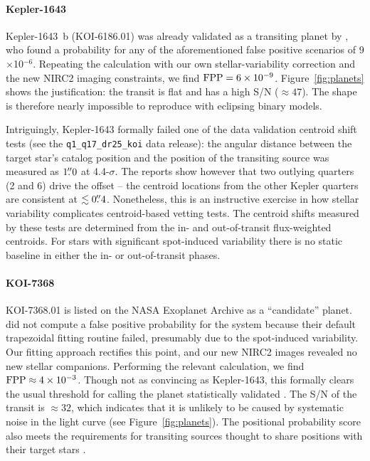\documentclass[12pt,twocolumn]{aastex63}
\begin{document}
\paragraph{Kepler-1643}
Kepler-1643~b (KOI-6186.01) was already validated as a transiting
planet by \citet{morton_false_2016}, who found a probability for any
of the aforementioned false positive scenarios of 9$\times$10$^{-6}$.
Repeating the calculation with our own stellar-variability correction
and the new NIRC2 imaging constraints, we find ${\rm FPP} =
6\times10^{-9}$.  Figure~\ref{fig:planets} shows the justification:
the transit is flat and has a high S/N ($\approx 47$).  The shape is
therefore nearly impossible to reproduce with eclipsing binary models.

Intriguingly, Kepler-1643 formally failed one of the data validation
centroid shift tests (see the \texttt{q1\_q17\_dr25\_koi} data
release): the angular distance between the target star's catalog
position and the position of the transiting source was measured as
$1\mbox{$.\!\!^{\prime\prime}$}0$ at 4.4-$\sigma$.  The reports show however that two
outlying quarters (2 and 6) drive the offset -- the centroid locations
from the other Kepler quarters are consistent at $\lesssim 0\mbox{$.\!\!^{\prime\prime}$}4$.
Nonetheless, this is an instructive exercise in how stellar
variability complicates centroid-based vetting tests.  The centroid
shifts measured by these tests are determined from the in- and
out-of-transit flux-weighted centroids.  For stars with significant
spot-induced variability there is no static baseline in either the in-
or out-of-transit phases.

\paragraph{KOI-7368}
KOI-7368.01 is listed on the NASA Exoplanet Archive as a ``candidate''
planet.  \citet{morton_false_2016} did not compute a false positive
probability for the system because their default trapezoidal fitting
routine failed, presumably due to the spot-induced variability.  Our
fitting approach rectifies this point, and our new NIRC2 images
revealed no new stellar companions.  Performing the relevant
calculation, we find ${\rm FPP} \approx 4\times10^{-3}$.  Though not
as convincing as Kepler-1643, this formally clears the usual threshold
for calling the planet statistically validated
\citep{morton_efficient_2012}.  The S/N of the transit is
$\approx$$32$, which indicates that it is unlikely to be caused by
systematic noise in the light curve (see Figure~\ref{fig:planets}).
The positional probability score also meets the requirements for
transiting sources thought to share positions with their target stars
\citep{2017ksci.rept...16B}. 
\end{document}
